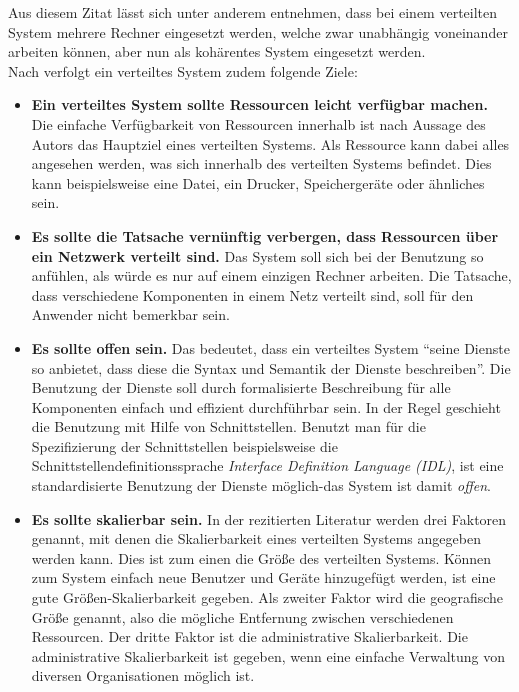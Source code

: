 Aus diesem Zitat lässt sich unter anderem entnehmen, dass bei einem verteilten System mehrere Rechner eingesetzt werden, welche zwar unabhängig voneinander arbeiten können, aber nun als kohärentes System eingesetzt werden. \\
Nach \citep{tanenbaum} verfolgt ein verteiltes System zudem folgende Ziele: 
\begin{itemize}
	\item \textbf{Ein verteiltes System sollte Ressourcen leicht verfügbar machen.}
	Die einfache Verfügbarkeit von Ressourcen innerhalb ist nach Aussage des Autors das Hauptziel eines verteilten Systems. Als Ressource kann dabei alles angesehen werden, was sich innerhalb des verteilten Systems befindet. Dies kann beispielsweise eine Datei, ein Drucker, Speichergeräte oder ähnliches sein. 
	\item \textbf{Es sollte die Tatsache vernünftig verbergen, dass Ressourcen über ein Netzwerk verteilt sind.}
	Das System soll sich bei der Benutzung so anfühlen, als würde es nur auf einem einzigen Rechner arbeiten. Die Tatsache, dass verschiedene Komponenten in einem Netz verteilt sind, soll für den Anwender nicht bemerkbar sein.
	\item \textbf{Es sollte offen sein.}
	Das bedeutet, dass ein verteiltes System \enquote{seine Dienste so anbietet, dass diese die Syntax und Semantik der Dienste beschreiben}. Die Benutzung der Dienste soll durch formalisierte Beschreibung für alle Komponenten einfach und effizient durchführbar sein. In der Regel geschieht die Benutzung mit Hilfe von Schnittstellen. Benutzt man für die Spezifizierung der Schnittstellen beispielsweise die Schnittstellendefinitionssprache \emph{Interface Definition Language (IDL)}, ist eine standardisierte Benutzung der Dienste möglich-das System ist damit \emph{offen}.
	\item \textbf{Es sollte skalierbar sein.}
In der rezitierten Literatur werden drei Faktoren genannt, mit denen die Skalierbarkeit eines verteilten Systems angegeben werden kann. Dies ist zum einen die Größe des verteilten Systems. Können zum System einfach neue Benutzer und Geräte hinzugefügt werden, ist eine gute Größen-Skalierbarkeit gegeben. Als zweiter Faktor wird die geografische Größe genannt, also die mögliche Entfernung zwischen verschiedenen Ressourcen. Der dritte Faktor ist die administrative Skalierbarkeit. Die administrative Skalierbarkeit ist gegeben, wenn eine einfache Verwaltung von diversen Organisationen möglich ist. 
\end{itemize}

